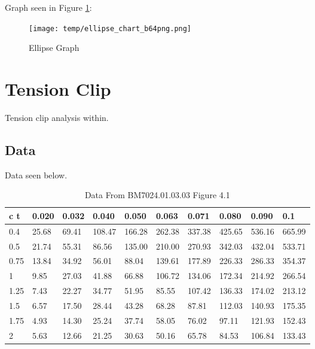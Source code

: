 \documentclass[11pt]{article}
\begin{document}
Graph seen in Figure \ref{fig:EA1}:

\begin{figure}[]
\label{fig:EA1}
\texttt{[image: temp/ellipse\_chart\_b64png.png]}
\caption{Ellipse Graph}
\end{figure}
\clearpage
\section{Tension Clip}

Tension clip analysis within.

\subsection{Data}

Data seen below.

\begin{table}[!ht]
    \centering
	\label{tab:D4_1}
	\caption{Data From BM7024.01.03.03 Figure 4.1}
    \begin{tabular}{|l|l|l|l|l|l|l|l|l|l|}
    \hline
        c            t & 0.020  & 0.032  & 0.040  & 0.050  & 0.063  & 0.071  & 0.080  & 0.090  & 0.1 \\ \hline
        0.4 & 25.68  & 69.41  & 108.47  & 166.28  & 262.38  & 337.38  & 425.65  & 536.16  & 665.99  \\ \hline
        0.5 & 21.74  & 55.31  & 86.56  & 135.00  & 210.00  & 270.93  & 342.03  & 432.04  & 533.71  \\ \hline
        0.75 & 13.84  & 34.92  & 56.01  & 88.04  & 139.61  & 177.89  & 226.33  & 286.33  & 354.37  \\ \hline
        1 & 9.85  & 27.03  & 41.88  & 66.88  & 106.72  & 134.06  & 172.34  & 214.92  & 266.54  \\ \hline
        1.25 & 7.43  & 22.27  & 34.77  & 51.95  & 85.55  & 107.42  & 136.33  & 174.02  & 213.12  \\ \hline
        1.5 & 6.57  & 17.50  & 28.44  & 43.28  & 68.28  & 87.81  & 112.03  & 140.93  & 175.35  \\ \hline
        1.75 & 4.93  & 14.30  & 25.24  & 37.74  & 58.05  & 76.02  & 97.11  & 121.93  & 152.43  \\ \hline
        2 & 5.63  & 12.66  & 21.25  & 30.63  & 50.16  & 65.78  & 84.53  & 106.84  & 133.43 \\ \hline
    \end{tabular}
\end{table}
\end{document}
